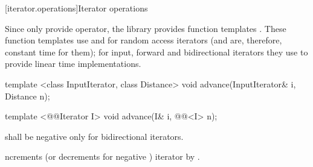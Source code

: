 [iterator.operations]{Iterator operations}

\pnum
Since only  provide \tcode{+}  \tcode{-}
operator, the library provides  function templates
\newnewtxt{,}
.
These
function templates
use
\tcode{+}
and
\tcode{-}
for random access iterators (and are, therefore, constant
time for them); for input, forward and bidirectional iterators they use
\tcode{++}
to provide linear time
implementations.

%
\begin{removedblock}
\begin{itemdecl}
template <class InputIterator, class Distance>
  void advance(InputIterator& i, Distance n);
\end{itemdecl}
\end{removedblock}
\begin{addedblock}
\begin{itemdecl}
template <@@Iterator I>
  void advance(I& i, @@<I> n);
\end{itemdecl}
\end{addedblock}

\begin{itemdescr}
\pnum
\requires
{}
shall be negative only for bidirectional iterators.

\pnum
\effects
{}ncrements (or decrements for negative
)
iterator
by
.
\end{itemdescr}

